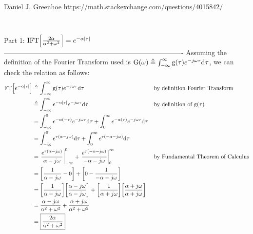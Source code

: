 Daniel J. Greenhoe
https://math.stackexchange.com/questions/4015842/


$\newcommand{\eqd}{\triangleq}$
$\newcommand{\eqa}{\approx}$
$\newcommand{\abs}[1]{{\left\lvert #1 \right\rvert}}$
$\newcommand{\brp}[1]{{\left(#1\right)}}$
$\newcommand{\brs}[1]{{\left[#1\right]}}$
$\newcommand{\brlr}[1]{\left.#1\right|}$
$\newcommand{\deriv} [2]   {{\frac{\mathrm{d}#1}{\mathrm{d}#2} }}$
$\newcommand{\R}{\Bbb{R}}$
$\newcommand{\intcc} [2]  {{\left[#1:#2\right]}}$
$\newcommand{\intoo} [2]  {{\left(#1:#2\right)}}$
$\newcommand{\intoc} [2]  {{\left(#1:#2\right]}}$
$\newcommand{\intco} [2]  {{\left[#1:#2\right)}}$
$\newcommand{\ff}{\mathrm{f}}$
$\newcommand{\fF}{\mathrm{F}}$
$\newcommand{\fG}{\mathrm{G}}$
$\newcommand{\fg}{\mathrm{g}}$
$\newcommand{\fphi}{\mathrm{\phi}}$
$\newcommand{\dx}{\mathrm{dx}}$
$\newcommand{\dtau}{\mathrm{d\tau}}$
$\newcommand{\du}{\mathrm{du}}$
$\newcommand{\dv}{\mathrm{dv}}$
$\newcommand{\thme}[1]{#1}$
$\newcommand{\opFT}{\mathrm{FT}}$
$\newcommand{\opIFT}{\mathrm{IFT}}$

Part 1: $\opIFT\brs{\frac{2\alpha}{\alpha^2+\omega^2}} = e^{-\alpha\abs{\tau}}$
-------------------------------------------------------------------------------
Assuming the definition of the Fourier Transform used is 
$\fG(\omega)\eqd \int_{-\infty}^{\infty}\fg(\tau)e^{-j\omega\tau}\dtau$,
we can check the relation as follows:
\begin{align}
  \opFT\brs{e^{-\alpha\abs{\tau}}}
    &\eqd \int_{-\infty}^{\infty}\fg(\tau)e^{-j\omega\tau}\dtau
    && \text{by definition Fourier Transform}
  \\&\eqd \int_{-\infty}^{\infty} e^{-\alpha\abs{\tau}} e^{-j\omega\tau}\dtau
    && \text{by definition of $\fg(\tau)$}
  \\&= \int_{-\infty}^{0} e^{-\alpha(-\tau)} e^{-j\omega\tau}\dtau
     + \int_{0}^{\infty} e^{-\alpha(\tau)} e^{-j\omega\tau}\dtau
  \\&= \int_{-\infty}^{0} e^{\tau(\alpha-j\omega)}\dtau
     + \int_{0}^{\infty} e^{\tau(-\alpha-j\omega)}\dtau
  \\&= \brlr{\frac{e^{\tau(\alpha-j\omega)}}{\alpha-j\omega}}_{-\infty}^{0} 
     + \brlr{\frac{e^{\tau(-\alpha-j\omega)}}{-\alpha-j\omega}}_{0}^{\infty} 
    && \text{by Fundamental Theorem of Calculus}
  \\&= \brs{\frac{1}{\alpha-j\omega} - 0}
     + \brs{0- \frac{1}{-\alpha-j\omega}}
  \\&= \brs{\frac{1}{\alpha-j\omega}}\brs{\frac{\alpha-j\omega}{\alpha-j\omega}}
     + \brs{\frac{1}{\alpha+j\omega}}\brs{\frac{\alpha+j\omega}{\alpha+j\omega}}
  \\&= \frac{\alpha-j\omega}{\alpha^2+\omega^2}
     + \frac{\alpha+j\omega}{\alpha^2+\omega^2}
  \\&= \boxed{\frac{2\alpha}{\alpha^2+\omega^2}}
\end{align}

